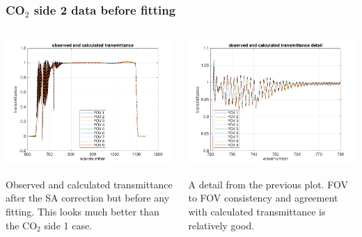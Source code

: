 \documentclass[10pt]{beamer}
\begin{document}
\begin{frame}
\frametitle{CO$_2$ side 2 data before fitting}
\begin{columns}[t]
\begin{column}{0.5\textwidth}  
  \begin{centering}
  \includegraphics[width=\textwidth]{01-19_pfh_s2_CO2/spec_test2_all.png}
  \end{centering}\vspace{3mm}

Observed and calculated transmittance after the SA correction but
before any fitting.  This looks much better than the CO$_2$ side 1
case.

\end{column}

\begin{column}{0.5\textwidth}
  \begin{centering}
  \includegraphics[width=\textwidth]{01-19_pfh_s2_CO2/spec_test2_zoom.png}
  \end{centering}\vspace{3mm}

A detail from the previous plot.  FOV to FOV consistency and
agreement with calculated transmittance is relatively good.

\end{column}
\end{columns}
\end{frame}
\end{document}
